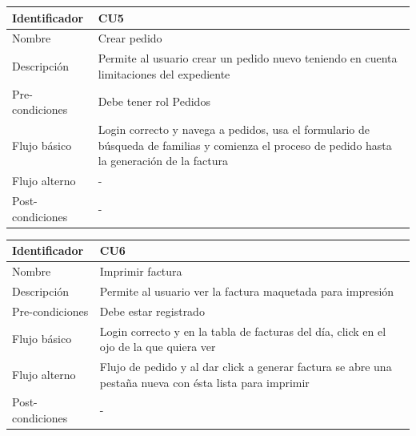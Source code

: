 \vspace{1em}
\par
\begin{tabular}{||p{3cm}|p{11cm}||} 
\hline
Identificador & CU5 \\ [0.5ex] 
\hline\hline
Nombre & Crear pedido \\ 
\hline
Descripción & Permite al usuario crear un pedido nuevo teniendo en cuenta limitaciones del expediente \\
\hline
Pre-condiciones & Debe tener rol Pedidos \\
\hline
Flujo básico & Login correcto y navega a pedidos, usa el formulario de búsqueda de familias y comienza el proceso de pedido hasta la generación de la factura \\
\hline
Flujo alterno & - \\
\hline
Post-condiciones & - \\
\hline
\end{tabular}

\vspace{1em}
\par
\begin{tabular}{||p{3cm}|p{11cm}||} 
\hline
Identificador & CU6 \\ [0.5ex] 
\hline\hline
Nombre & Imprimir factura \\ 
\hline
Descripción & Permite al usuario ver la factura maquetada para impresión \\
\hline
Pre-condiciones & Debe estar registrado \\
\hline
Flujo básico & Login correcto y en la tabla de facturas del día, click en el ojo de la que quiera ver \\
\hline
Flujo alterno & Flujo de pedido y al dar click a generar factura se abre una pestaña nueva con ésta lista para imprimir \\
\hline
Post-condiciones & - \\
\hline
\end{tabular}

